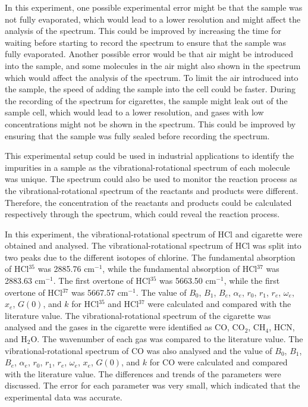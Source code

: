 \documentclass[twocolumn]{article} %
\begin{document}
In this experiment, one possible experimental error might be that the sample was not fully evaporated, which would lead to a lower resolution and might affect the analysis of the spectrum. This could be improved by increasing the time for waiting before starting to record the spectrum to ensure that the sample was fully evaporated. Another possible error would be that air might be introduced into the sample, and some molecules in the air might also shown in the spectrum which would affect the analysis of the spectrum. To limit the air introduced into the sample, the speed of adding the sample into the cell could be faster. 
During the recording of the spectrum for cigarettes, the sample might leak out of the sample cell, which would lead to a lower resolution, and gases with low concentrations might not be shown in the spectrum. This could be improved by ensuring that the sample was fully sealed before recording the spectrum.

This experimental setup could be used in industrial applications to identify the impurities in a sample as the vibrational-rotational spectrum of each molecule was unique. The spectrum could also be used to monitor the reaction process as the vibrational-rotational spectrum of the reactants and products were different. Therefore, the concentration of the reactants and products could be calculated respectively through the spectrum, which could reveal the reaction process. 

In this experiment, the vibrational-rotational spectrum of HCl and cigarette were obtained and analysed. The vibrational-rotational spectrum of HCl was split into two peaks due to the different isotopes of chlorine. The fundamental absorption of HCl$^{35}$ was 2885.76 cm$^{-1}$, while the fundamental absorption of HCl$^{37}$ was 2883.63 cm$^{-1}$. The first overtone of HCl$^{35}$ was 5663.50 cm$^{-1}$, while the first overtone of HCl$^{37}$ was 5667.57 cm$^{-1}$. The value of $B_0$, $B_1$, $B_e$, $\alpha_e$, $r_0$, $r_1$, $r_e$, $\omega_e$, $x_e$, $G(0)$, and $k$ for HCl$^{35}$ and HCl$^{37}$ were calculated and compared with the literature value. The vibrational-rotational spectrum of the cigarette was analysed and the gases in the cigarette were identified as CO, CO$_2$, CH$_4$, HCN, and H$_2$O. The wavenumber of each gas was compared to the literature value. The vibrational-rotational spectrum of CO was also analysed and the value of $B_0$, $B_1$, $B_e$, $\alpha_e$, $r_0$, $r_1$, $r_e$, $\omega_e$, $x_e$, $G(0)$, and $k$ for CO were calculated and compared with the literature value. The differences and trends of the parameters were discussed. The error for each parameter was very small, which indicated that the experimental data was accurate.
\end{document}
